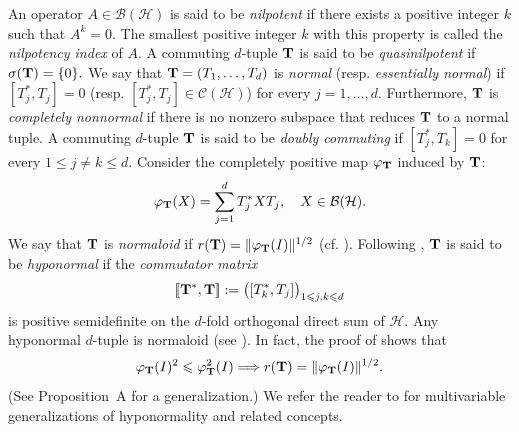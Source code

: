 \documentclass[10pt, a4paper, oneside, reqno]{amsproc}
\numberwithin{equation}{section}
\theoremstyle{remark}
\theoremstyle{definition}
\newcommand*{\Le}{\leqslant}
\begin{document}
An operator $A \in \mathcal B(\mathcal H)$ is said to be {\it nilpotent} if there exists a positive integer $k$ such that $A^k=0$. The smallest positive integer $k$ with this property is called the {\it nilpotency index} of $A$. 
A commuting $d$-tuple ${\bf T}$ is said to be {\it quasinilpotent} if $\sigma({\bf T})=\{0\}.$ 
We say that ${\bf T}=(T_1,\ldots,T_d)$ is {\it normal} (resp. {\it essentially normal}) if $[T_j^*,T_j]=0$ (resp. $[T_j^*,T_j] \in \mathcal C(\mathcal H)$) for every $j=1,\ldots,d$.  Furthermore, ${\bf T}$ is {\it completely nonnormal} if there is no nonzero subspace that reduces ${\bf T}$ to a normal tuple.
A commuting $d$-tuple ${\bf T}$ is said to be {\it doubly commuting} if $[T^*_j, T_k]=0$ for every $1 \Le j \neq k \Le d.$ 
Consider the completely positive map $\varphi_{\bf T}$ induced by ${\bf T}$:
\begin{equation} 
\label{varphi-T}
\varphi_{\bf T}(X) = \sum_{j=1}^d T^*_jXT_j, \quad X \in \mathcal B(\mathcal H).
\end{equation}
We say that ${\bf T}$ is {\it normaloid} if $r({\bf T})=\|\varphi_{\bf T}(I)\|^{1/2}$ (cf. \cite{CT1984, S2025}).
Following \cite{At1988}, ${\bf T}$ is said to be {\it hyponormal} if the {\it commutator matrix} $$[\![{\bf T}^*, {\bf T}]\!]:=\displaystyle \big([T_k^*,T_j]\big)_{1\Le j,k \Le d}$$ is positive semidefinite on the $d$-fold orthogonal direct sum of $\mathcal H$. Any hyponormal $d$-tuple is normaloid (see \cite[Lemma~3.10]{CS2017}). In fact,
the proof of \cite[Lemma~3.10]{CS2017} shows that
\begin{equation} \label{special-appendix}
\varphi_{\bf T}(I)^2 \Le \varphi^2_{\bf T}(I)\Longrightarrow r({\bf T})
=
\|\varphi_{\bf T}(I)\|^{1/2}.
\end{equation}
(See Proposition~A for a generalization.)
We refer the reader to \cite{At1988, B1971, CS2017, CCHZ2000, CT1984, Cu1990, DY1992, EP2001, HK2010, M2002, MPS2022, S2025, X1983} for multivariable generalizations of hyponormality and related concepts. 
\end{document}
